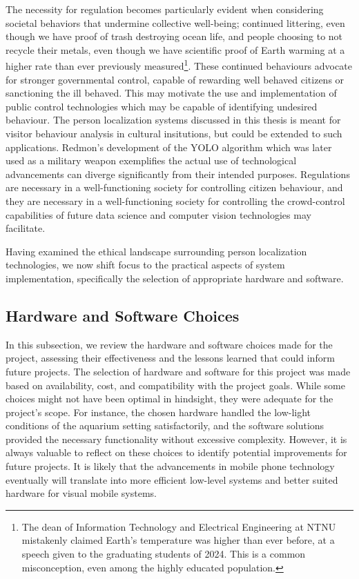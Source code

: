 The necessity for regulation becomes particularly evident when considering societal behaviors that undermine collective well-being; continued littering, even though we have proof of trash destroying ocean life, and people choosing to not recycle their metals, even though we have scientific proof of Earth warming at a higher rate than ever previously measured\footnote{The dean of Information Technology and Electrical Engineering at NTNU mistakenly claimed Earth's temperature was higher than ever before, at a speech given to the graduating students of 2024. This is a common misconception, even among the highly educated population.}. These continued behaviours advocate for stronger governmental control, capable of rewarding well behaved citizens or sanctioning the ill behaved. This may motivate the use and implementation of public control technologies which may be capable of identifying undesired behaviour. The person localization systems discussed in this thesis is meant for visitor behaviour analysis in cultural insitutions, but could be extended to such applications. Redmon's development of the YOLO algorithm which was later used as a military weapon exemplifies the actual use of technological advancements can diverge significantly from their intended purposes. Regulations are necessary in a well-functioning society for controlling citizen behaviour, and they are necessary in a well-functioning society for controlling the crowd-control capabilities of future data science and computer vision technologies may facilitate.

Having examined the ethical landscape surrounding person localization technologies, we now shift focus to the practical aspects of system implementation, specifically the selection of appropriate hardware and software.

\subsection{Hardware and Software Choices}
\label{sec:hardware_choices}
In this subsection, we review the hardware and software choices made for the project, assessing their effectiveness and the lessons learned that could inform future projects. The selection of hardware and software for this project was made based on availability, cost, and compatibility with the project goals. While some choices might not have been optimal in hindsight, they were adequate for the project's scope. For instance, the chosen hardware handled the low-light conditions of the aquarium setting satisfactorily, and the software solutions provided the necessary functionality without excessive complexity. However, it is always valuable to reflect on these choices to identify potential improvements for future projects. It is likely that the advancements in mobile phone technology eventually will translate into more efficient low-level systems and better suited hardware for visual mobile systems.

